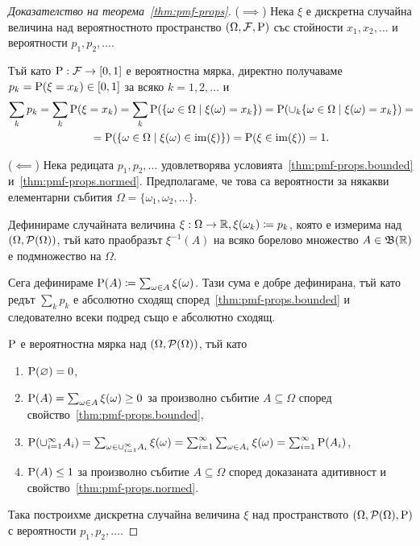 \documentclass[numbers=endperiod, DIV=15, bibliography=totocnumbered]{scrartcl}
\begin{document}
\begin{proof}[Доказателство на теорема~\ref{thm:pmf-props}]
  ($\implies$) Нека $\xi$ е дискретна случайна величина над вероятностното пространство $(\Omega, \mathcal{F}, \operatorname{P})$ със стойности $x_1, x_2, \ldots$ и вероятности $p_1, p_2, \ldots$.

  Тъй като $\operatorname{P}: \mathcal{F} \to [0, 1]$ е вероятностна мярка, директно получаваме $p_k = \operatorname{P}(\xi = x_k) \in [0, 1]$ за всяко $k = 1, 2, \ldots$ и
  \begin{multline*}
    \sum_k p_k
    =
    \sum_k \operatorname{P}(\xi = x_k)
    =
    \sum_k \operatorname{P}(\{ \omega \in \Omega \mid \xi(\omega) = x_k \})
    =
    \operatorname{P}(\cup_k \{ \omega \in \Omega \mid \xi(\omega) = x_k \})
    = \\ =
    \operatorname{P}(\{ \omega \in \Omega \mid \xi(\omega) \in \operatorname{im}(\xi) \})
    =
    \operatorname{P}(\xi \in \operatorname{im}(\xi))
    =
    1.
  \end{multline*}

  ($\impliedby$) Нека редицата $p_1, p_2, \ldots$ удовлетворява условията~\ref{thm:pmf-props.bounded} и~\ref{thm:pmf-props.normed}. Предполагаме, че това са вероятности за някакви елементарни събития $\Omega = \{ \omega_1, \omega_2, \ldots \}$.

  Дефинираме случайната величина $\xi: \Omega \to \mathbb{R}, \xi(\omega_k) \coloneqq p_k$, която е измерима над $(\Omega, \mathcal{P}(\Omega))$, тъй като праобразът $\xi^{-1}(A)$ на всяко борелово множество $A \in \mathfrak{B}(\mathbb{R})$ е подмножество на $\Omega$.

  Сега дефинираме $\operatorname{P}(A) \coloneqq \sum_{\omega \in A} \xi(\omega)$. Тази сума е добре дефинирана, тъй като редът $\sum_k p_k$ е абсолютно сходящ според~\ref{thm:pmf-props.bounded} и следователно всеки подред също е абсолютно сходящ.

  $\operatorname{P}$ е вероятностна мярка над $(\Omega, \mathcal{P}(\Omega))$, тъй като
  \begin{enumerate}
    \item $\operatorname{P}(\varnothing) = 0$,
    \item $\operatorname{P}(A) = \sum_{\omega \in A} \xi(\omega) \geq 0$ за произволно събитие $A \subseteq \Omega$ според свойство~\ref{thm:pmf-props.bounded},
    \item $\operatorname{P}(\cup_{i=1}^\infty A_i) = \sum_{\omega \in \cup_{i=1}^\infty A_i} \xi(\omega) = \sum_{i=1}^\infty \sum_{\omega \in A_i} \xi(\omega) = \sum_{i=1}^\infty \operatorname{P}(A_i)$,
    \item $\operatorname{P}(A) \leq 1$ за произволно събитие $A \subseteq \Omega$ според доказаната адитивност и свойство~\ref{thm:pmf-props.normed}.
  \end{enumerate}
  Така построихме дискретна случайна величина $\xi$ над пространството $(\Omega, \mathcal{P}(\Omega), \operatorname{P})$ с вероятности $p_1, p_2, \ldots$.
\end{proof}
\end{document}
